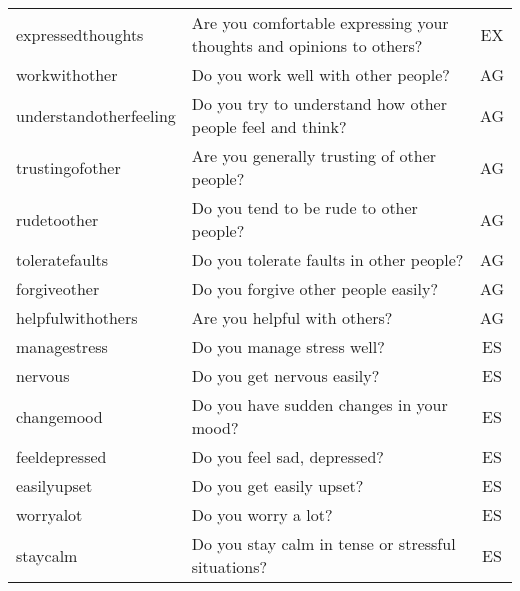 \begin{table}[htbp]
{\begin{tabular}{llc}
    expressedthoughts & Are you comfortable expressing your thoughts and opinions to others? & EX \\
    workwithother & Do you work well with other people? & AG   \\
    understandotherfeeling & Do you try to understand how other people feel and think? & AG  \\
    trustingofother & Are you generally trusting of other people? & AG  \\
    rudetoother & Do you tend to be rude to other people? & AG   \\
    toleratefaults & Do you tolerate faults in other people? & AG   \\
    forgiveother & Do you forgive other people easily? & AG   \\
    helpfulwithothers & Are you helpful with others? & AG  \\
    managestress & Do you manage stress well? & ES   \\
    nervous & Do you get nervous easily? & ES  \\
    changemood & Do you have sudden changes in your mood? & ES   \\
    feeldepressed & Do you feel sad, depressed? & ES   \\
    easilyupset & Do you get easily upset? & ES   \\
    worryalot & Do you worry a lot? & ES   \\
    staycalm & Do you stay calm in tense or stressful situations? & ES  \\
    \bottomrule
    \end{tabular}%
	}
  \label{tab:big5}%
\end{table}%
